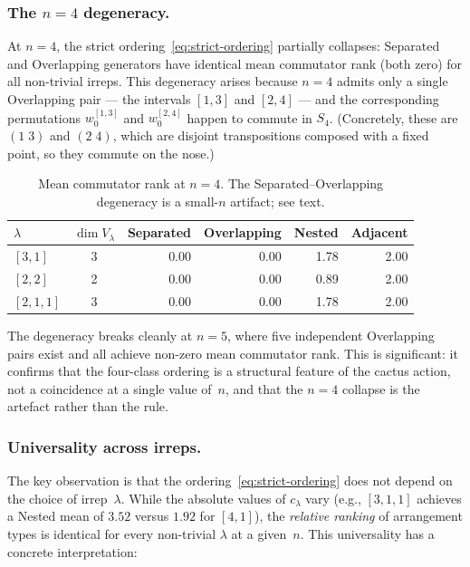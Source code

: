 \subsubsection{The $n = 4$ degeneracy.}

At $n = 4$, the strict ordering~\eqref{eq:strict-ordering} partially
collapses: Separated and Overlapping generators have identical mean
commutator rank (both zero) for all non-trivial irreps.  This
degeneracy arises because $n = 4$ admits only a single Overlapping pair
--- the intervals $[1,3]$ and $[2,4]$ --- and the corresponding
permutations $w_0^{[1,3]}$ and $w_0^{[2,4]}$ happen to commute in
$S_4$.  (Concretely, these are $(1\;3)$ and $(2\;4)$, which are
disjoint transpositions composed with a fixed point, so they commute on
the nose.)

\begin{table}[t]
\centering
\caption{Mean commutator rank at $n = 4$.  The Separated--Overlapping
degeneracy is a small-$n$ artifact; see text.}
\label{tab:n4-commutator-rank}
\smallskip
\begin{tabular}{lcrrrr}
\hline
$\lambda$ & $\dim V_\lambda$ & Separated & Overlapping & Nested & Adjacent \\
\hline
$[3,1]$   & 3 & 0.00 & 0.00 & 1.78 & 2.00 \\
$[2,2]$   & 2 & 0.00 & 0.00 & 0.89 & 2.00 \\
$[2,1,1]$ & 3 & 0.00 & 0.00 & 1.78 & 2.00 \\
\hline
\end{tabular}
\end{table}

\noindent
The degeneracy breaks cleanly at $n = 5$, where five independent
Overlapping pairs exist and all achieve non-zero mean commutator rank.
This is significant: it confirms that the four-class ordering is a
structural feature of the cactus action, not a coincidence at a single
value of~$n$, and that the $n = 4$ collapse is the artefact rather than
the rule.

\subsubsection{Universality across irreps.}

The key observation is that the ordering~\eqref{eq:strict-ordering}
does not depend on the choice of irrep~$\lambda$.  While the absolute
values of $c_\lambda$ vary (e.g., $[3,1,1]$ achieves a Nested mean of
$3.52$ versus $1.92$ for $[4,1]$), the \emph{relative ranking} of
arrangement types is identical for every non-trivial $\lambda$ at a
given~$n$.  This universality has a concrete interpretation:

